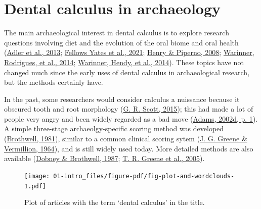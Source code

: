 \documentclass[
  letterpaper,
]{book}
\begin{document}
\hypertarget{intro-arch}{%
\section{Dental calculus in archaeology}\label{intro-arch}}

The main archaeological interest in dental calculus is to explore
research questions involving diet and the evolution of the oral biome
and oral health
(\protect\hyperlink{ref-adlerSequencingAncient2013}{Adler et al., 2013};
\protect\hyperlink{ref-yatesOralMicrobiome2021}{Fellows Yates et al.,
2021}; \protect\hyperlink{ref-henryCalculusSyria2008}{Henry \& Piperno,
2008}; \protect\hyperlink{ref-warinnerPathogensHost2014}{Warinner,
Rodrigues, et al., 2014};
\protect\hyperlink{ref-warinnerEvidenceMilk2014}{Warinner, Hendy, et
al., 2014}). These topics have not changed much since the early uses of
dental calculus in archaeological research, but the methods certainly
have.

In the past, some researchers would consider calculus a nuissance
because it obscured tooth and root morphology
(\protect\hyperlink{ref-scottBriefHistory2015}{G. R. Scott, 2015}); this
had made a lot of people very angry and been widely regarded as a bad
move (\protect\hyperlink{ref-adamsRestaurantEnd2002}{Adams, 2002d, p.
1}). A simple three-stage archaeolgy-specific scoring method was
developed (\protect\hyperlink{ref-brothwellDiggingBones1981}{Brothwell,
1981}), similar to a common clinical scoring sytem
(\protect\hyperlink{ref-greeneSimplifiedOral1964}{J. G. Greene \&
Vermillion, 1964}), and is still widely used today. More detailed
methods are also available
(\protect\hyperlink{ref-dobneyMethodEvaluating1987}{Dobney \& Brothwell,
1987}; \protect\hyperlink{ref-greeneQuantifyingCalculus2005}{T. R.
Greene et al., 2005}).

\begin{figure}

{\centering \texttt{[image: 01-intro\_files/figure-pdf/fig-plot-and-wordclouds-1.pdf]}

}

\caption{\label{fig-plot-and-wordclouds}Plot of articles with the term
`dental calculus' in the title.}

\end{figure}
\end{document}
